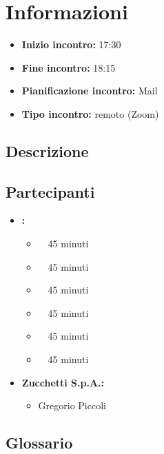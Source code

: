 \section{Informazioni}
\begin{itemize}
	\item \textbf{Inizio incontro:} 17:30
	\item \textbf{Fine incontro:} 18:15
	\item \textbf{Pianificazione incontro:} Mail
	\item \textbf{Tipo incontro:} remoto (Zoom)
\end{itemize}

\subsection{Descrizione}
\DocDescription

\subsection{Partecipanti}

\begin{itemize}
	\item \textbf{\GroupName:}
	\begin{itemize}
		\item \tommaso \ \rightarrow\ 45 minuti
		\item \marco \ \rightarrow\ 45 minuti
		\item \riccardo \ \rightarrow\ 45 minuti
		\item \raul \ \rightarrow\ 45 minuti
		\item \martina \ \rightarrow\ 45 minuti
		\item \sebastiano \ \rightarrow\ 45 minuti
	\end{itemize}
	\item \textbf{Zucchetti S.p.A.:}
    \begin{itemize}
        \item Gregorio Piccoli
    \end{itemize}
\end{itemize}

\subsection{Glossario}
\GlossarioIntroduzioneVE

\clearpage
